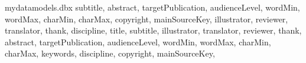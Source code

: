 \isPortfolio
{
}
{
}




\usepackage{filecontents}

\begin{filecontents}{mydatamodels.dbx}
  \DeclareDatamodelFields[type=field, datatype=literal]
  {
    subtitle,
    abstract,
    targetPublication,
    audienceLevel,
    wordMin,
    wordMax,
    charMin,
    charMax,
    copyright,
    mainSourceKey,
  }
  \DeclareDatamodelFields[type=list,datatype=name]
  {
    illustrator,
    reviewer,
    translator,
    thank,
    discipline,
  }
  \DeclareDatamodelFields[type=field, datatype=date, skipout]
  {
  }
  \DeclareDatamodelFields[type=field, datatype=verbatim]
  {
  }
  \DeclareDatamodelEntryfields[myarticle]
  {
    title,
    subtitle,
    illustrator,
    translator,
    reviewer,
    thank,
    abstract,
    targetPublication,
    audienceLevel,
    wordMin,
    wordMax,
    charMin,
    charMax,
    keywords,
    discipline,
    copyright,
    mainSourceKey,
    }
\end{filecontents}



